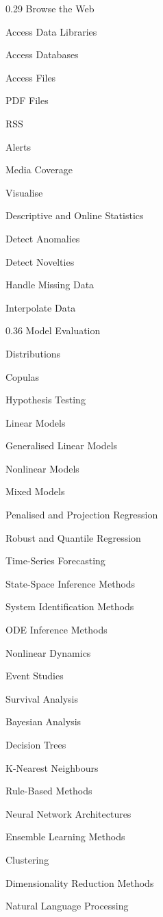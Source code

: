 \documentclass[10pt,a4paper]{article}
\begin{document}
\vspace{5mm}
\begin{mcol}{0.29\linewidth}
Browse the Web\par
Access Data Libraries\sub\par
Access Databases\sub\par
Access Files\sub\par
PDF Files\sub\par
RSS\sub\par
Alerts\sub\par
Media Coverage\par
Visualise\sub\par
Descriptive and Online Statistics\sub\par
Detect Anomalies\sub\par
Detect Novelties\par
Handle Missing Data\par
Interpolate Data
\end{mcol}\hfill
\begin{mcol}{0.36\linewidth}
Model Evaluation\sub\par
Distributions\sub\par
Copulas\sub\par
Hypothesis Testing\par
Linear Models\sub\par
Generalised Linear Models\par
Nonlinear Models\par
Mixed Models\sub\par
Penalised and Projection Regression\par
Robust and Quantile Regression\par
Time-Series Forecasting\par
State-Space Inference Methods\par
System Identification Methods\par
ODE Inference Methods\par
Nonlinear Dynamics\sub\par
Event Studies\par
Survival Analysis\sub\par
Bayesian Analysis\sub\par
Decision Trees\par
K-Nearest Neighbours\par
Rule-Based Methods\par
Neural Network Architectures\sub\par
Ensemble Learning Methods\par
Clustering\sub\par
Dimensionality Reduction Methods\sub\par
Natural Language Processing\sub
\end{mcol}\hfill
\end{document}
